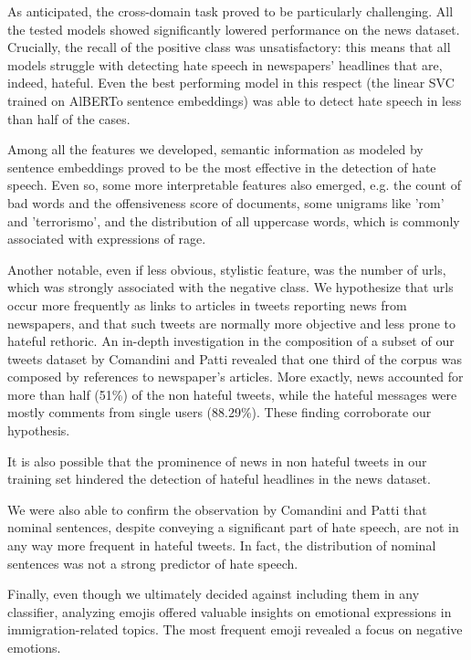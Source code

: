 As anticipated, the cross-domain task proved to be particularly challenging.
All the tested models showed significantly lowered performance on the news dataset.
Crucially, the recall of the positive class was unsatisfactory: this means that all models struggle with detecting hate speech in newspapers' headlines that are, indeed, hateful.
Even the best performing model in this respect (the linear SVC trained on AlBERTo sentence embeddings) was able to detect hate speech in less than half of the cases.

Among all the features we developed, semantic information as modeled by sentence embeddings proved to be the most effective in the detection of hate speech.
Even so, some more interpretable features also emerged, e.g. the count of bad words and the offensiveness score of documents, some unigrams like 'rom' and 'terrorismo', and the distribution of all uppercase words, which is commonly associated with expressions of rage.

Another notable, even if less obvious, stylistic feature, was the number of urls, which was strongly associated with the negative class.
We hypothesize that urls occur more frequently as links to articles in tweets reporting news from newspapers, and that such tweets are normally more objective and less prone to hateful rethoric.
An in-depth investigation in the composition of a subset of our tweets dataset by Comandini and Patti \cite{comandini_nominal_utterances} revealed that one third of the corpus was composed by references to newspaper's articles.
More exactly, news accounted for more than half (51\%) of the non hateful tweets, while the hateful messages were mostly comments from single users (88.29\%). These finding corroborate our hypothesis.

It is also possible that the prominence of news in non hateful tweets in our training set hindered the detection of hateful headlines in the news dataset.

We were also able to confirm the observation by Comandini and Patti that nominal sentences, despite conveying a significant part of hate speech, are not in any way more frequent in hateful tweets.
In fact, the distribution of nominal sentences was not a strong predictor of hate speech.

Finally, even though we ultimately decided against including them in any classifier, analyzing emojis offered valuable insights on emotional expressions in immigration-related topics. The most frequent emoji revealed a focus on negative emotions.
